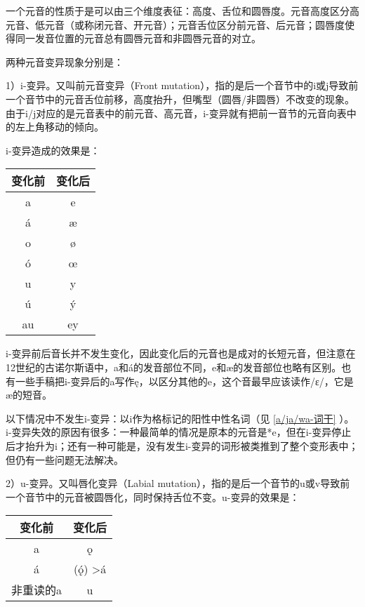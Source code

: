 一个元音的性质于是可以由三个维度表征：高度、舌位和圆唇度。元音高度区分高元音、低元音（或称闭元音、开元音）；元音舌位区分前元音、后元音；圆唇度使得同一发音位置的元音总有圆唇元音和非圆唇元音的对立。

两种元音变异现象分别是：

1）i-变异。又叫前元音变异（Front mutation），指的是后一个音节中的i或j导致前一个音节中的元音舌位前移，高度抬升，但嘴型（圆唇/非圆唇）不改变的现象。由于i/j对应的是元音表中的前元音、高元音，i-变异就有把前一音节的元音向表中的左上角移动的倾向。

i-变异造成的效果是：
\begin{table}[H]
  \centering
  \begin{tabular}{cc}
    \hline
    \textbf{变化前} & \textbf{变化后} \\ \hline
    a               & e               \\
    á               & æ               \\
    o               & ø               \\
    ó               & œ               \\
    u               & y               \\
    ú               & ý               \\
    au              & ey              \\ \hline
  \end{tabular}
\end{table}

i-变异前后音长并不发生变化，因此变化后的元音也是成对的长短元音，但注意在12世纪的古诺尔斯语中，a和á的发音部位不同，e和æ的发音部位也略有区别。也有一些手稿把i-变异后的a写作ę，以区分其他的e，这个音最早应该读作/ɛ/，它是æ的短音。

以下情况中不发生i-变异：以i作为格标记的阳性中性名词（见 \ref{a/ja/wa-词干} ）。i-变异失效的原因有很多：一种最简单的情况是原本的元音是*e，但在i-变异停止后才抬升为i；还有一种可能是，没有发生i-变异的词形被类推到了整个变形表中；但仍有一些问题无法解决。

2）u-变异。又叫唇化变异（Labial mutation），指的是后一个音节的u或v导致前一个音节中的元音被圆唇化，同时保持舌位不变。u-变异的效果是：

\begin{table}[H]
  \centering
  \begin{tabular}{cc}
    \hline
    \textbf{变化前} & \textbf{变化后}    \\ \hline
    a               & ǫ                  \\
    á               & (ǫ́) \textgreater á \\
    非重读的a       & u                  \\ \hline
  \end{tabular}
\end{table}

